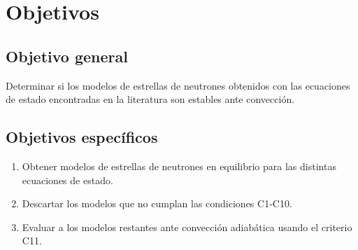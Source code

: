 \chapter{Objetivos}
\section{Objetivo general}
Determinar si los modelos de estrellas de neutrones obtenidos con las ecuaciones de estado encontradas en la literatura son estables ante convección.
\section{Objetivos específicos}
\begin{enumerate}
    \item Obtener modelos de estrellas de neutrones en equilibrio para las distintas ecuaciones de estado.
    \item Descartar los modelos que no cumplan las condiciones C1-C10.
    \item Evaluar a los modelos restantes ante convección adiabática usando el criterio C11.
\end{enumerate}
